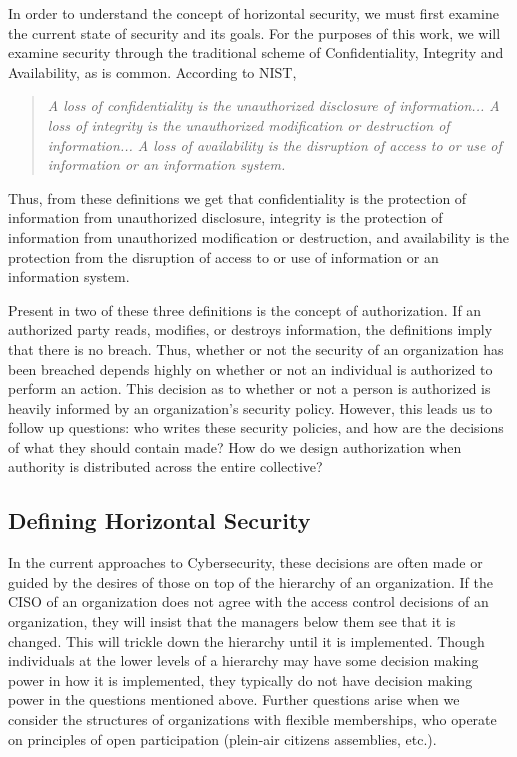 In order to understand the concept of horizontal security, we must first examine
the current state of security and its goals. For the purposes of this work, we
will examine security through the traditional scheme of Confidentiality,
Integrity and Availability, as is common. According to NIST,

\begin{quotation}
\textit{A loss of confidentiality is the unauthorized disclosure of 
information... A loss of integrity is the unauthorized modification or
destruction of information... A loss of availability is the disruption of access
to or use of information or an information system.}~\cite{pub2004standards}
\end{quotation}

Thus, from these definitions we get that confidentiality is the protection of 
information from unauthorized disclosure, integrity is the protection of
information from unauthorized modification or destruction, and availability is
the protection from the disruption of access to or use of information or an
information system.

Present in two of these three definitions is the concept of authorization. If an
authorized party reads, modifies, or destroys information, the definitions imply
that there is no breach. Thus, whether or not the security of an organization has
been breached depends highly on whether or not an individual is authorized to
perform an action. This decision as to whether or not a person is authorized is
heavily informed by an organization's security policy. However, this leads us to
follow up questions: who writes these security policies, and how are the
decisions of what they should contain made? How do we design authorization when
authority is distributed across the entire collective?

\subsection{Defining Horizontal Security}
\label{sec:definition}

In the current approaches to Cybersecurity, these decisions are often made or
guided by the desires of those on top of the hierarchy of an organization. If
the CISO of an organization does not agree with the access control decisions of
an organization, they will insist that the managers below them see that it is
changed. This will trickle down the hierarchy until it is implemented. Though
individuals at the lower levels of a hierarchy may have some decision making
power in how it is implemented, they typically do not have decision making power
in the questions mentioned above. Further questions arise when we consider the
structures of organizations with flexible memberships, who operate on principles
of open participation (plein-air citizens assemblies, etc.).

